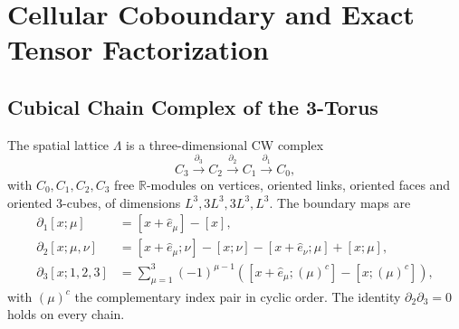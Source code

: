 \documentclass[11pt,a4paper]{article}
\theoremstyle{definition}
\newcommand{\R}{\mathbb{R}}
\begin{document}
\section{Cellular Coboundary and Exact Tensor Factorization}\label{sec:coboundary}

\subsection{Cubical Chain Complex of the 3-Torus}

The spatial lattice $\Lambda$ is a three-dimensional CW complex
\begin{equation}
  C_3 \xrightarrow{\ \partial_3\ } C_2 \xrightarrow{\ \partial_2\ } C_1 \xrightarrow{\ \partial_1\ } C_0,
\end{equation}
with $C_0,C_1,C_2,C_3$ free $\R$-modules on vertices, oriented links, oriented faces and oriented $3$-cubes, of dimensions $L^3, 3L^3, 3L^3, L^3$. The boundary maps are
\begin{align}
  \partial_1[x;\mu] &= [x+\hat e_\mu] - [x], \label{eq:d1}\\
  \partial_2[x;\mu,\nu] &= [x+\hat e_\mu;\nu] - [x;\nu] - [x+\hat e_\nu;\mu] + [x;\mu], \label{eq:d2}\\
  \partial_3[x;1,2,3] &= \sum_{\mu=1}^3(-1)^{\mu-1}\left([x+\hat e_\mu;(\mu)^c] - [x;(\mu)^c]\right), \label{eq:d3}
\end{align}
with $(\mu)^c$ the complementary index pair in cyclic order. The identity $\partial_2\partial_3 = 0$ holds on every chain.
\end{document}
